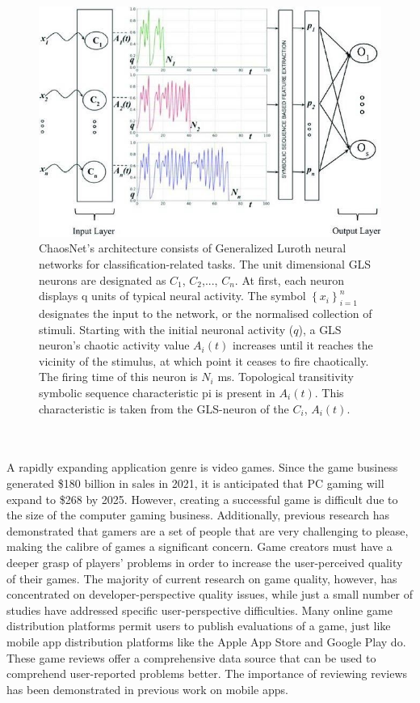\documentclass[runningheads]{llncs}
\begin{document}
\begin{figure}
\includegraphics[width=\textwidth]{1.jpg}
\caption{ChaosNet's architecture consists of Generalized Luroth neural networks for classification-related tasks. The unit dimensional GLS neurons are designated as $C_1$, $C_2$,..., $C_n$. At first, each neuron displays q units of typical neural activity. The symbol $\left\{x_i\right\}_{i=1}^n$ designates the input to the network, or the normalised collection of stimuli. Starting with the initial neuronal activity ($q$), a GLS neuron's chaotic activity value $A_i(t)$ increases until it reaches the vicinity of the stimulus, at which point it ceases to fire chaotically. The firing time of this neuron is $N_i$ ms. Topological transitivity symbolic sequence characteristic pi is present in $A_i(t)$. This characteristic is taken from the GLS-neuron of the $C_i$, $A_i(t)$.} \label{fig1}
\end{figure}
\\\\A rapidly expanding application genre is video games. Since the game business generated \$180 billion in sales in 2021, it is anticipated that PC gaming will expand to \$268 by 2025. However, creating a successful game is difficult due to the size of the computer gaming business. Additionally, previous research has demonstrated that gamers are a set of people that are very challenging to please, making the calibre of games a significant concern. Game creators must have a deeper grasp of players' problems in order to increase the user-perceived quality of their games. The majority of current research on game quality, however, has concentrated on developer-perspective quality issues, while just a small number of studies have addressed specific user-perspective difficulties. Many online game distribution platforms permit users to publish evaluations of a game, just like mobile app distribution platforms like the Apple App Store and Google Play do. These game reviews offer a comprehensive data source that can be used to comprehend user-reported problems better. The importance of reviewing reviews has been demonstrated in previous work on mobile apps. \textbf{\\}
\end{document}

